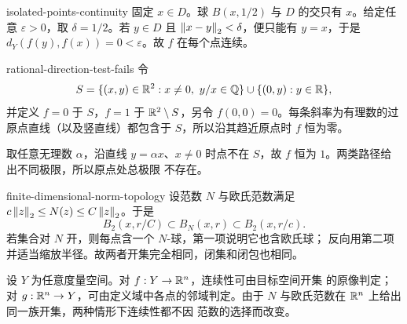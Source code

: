 \begin{solution}{isolated-points-continuity}
固定 \(x\in D\)。球 \(B(x,1/2)\) 与 \(D\) 的交只有 \(x\)。给定任意
\(\varepsilon>0\)，取 \(\delta=1/2\)。若 \(y\in D\) 且
\(\left\lVert x-y\right\rVert_2<\delta\)，便只能有 \(y=x\)，于是
\(d_Y(f(y),f(x))=0<\varepsilon\)。故 \(f\) 在每个点连续。
\end{solution}

\begin{solution}{rational-direction-test-fails}
令
\[
 S=\{(x,y)\in\R^2:x\ne0,\ y/x\in\Q\}\cup\{(0,y):y\in\R\},
\]
并定义 \(f=0\) 于 \(S\)，\(f=1\) 于 \(\mathbb{R}^2\setminus S\)，另令
\(f(0,0)=0\)。每条斜率为有理数的过原点直线（以及竖直线）都包含于
\(S\)，所以沿其趋近原点时 \(f\) 恒为零。

取任意无理数 \(\alpha\)，沿直线 \(y=\alpha x\)、\(x\ne0\) 时点不在
\(S\)，故 \(f\) 恒为 \(1\)。两类路径给出不同极限，所以原点处总极限
不存在。
\end{solution}

\begin{solution}{finite-dimensional-norm-topology}
设范数 \(N\) 与欧氏范数满足
\(c\left\lVert z\right\rVert_2\le N(z)\le C\left\lVert z\right\rVert_2\)。于是
\[
 B_2(x,r/C)\subset B_N(x,r)
 \subset B_2(x,r/c).
\]
若集合对 \(N\) 开，则每点含一个 \(N\)-球，第一项说明它也含欧氏球；
反向用第二项并适当缩放半径。故两者开集完全相同，闭集和闭包也相同。

设 \(Y\) 为任意度量空间。对 \(f:Y\to\mathbb{R}^n\)，连续性可由目标空间开集
的原像判定；对 \(g:\mathbb{R}^n\to Y\)，可由定义域中各点的邻域判定。由于
\(N\) 与欧氏范数在 \(\mathbb{R}^n\) 上给出同一族开集，两种情形下连续性都不因
范数的选择而改变。
\end{solution}

